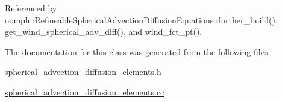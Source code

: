 Referenced by oomph\+::\+Refineable\+Spherical\+Advection\+Diffusion\+Equations\+::further\+\_\+build(), get\+\_\+wind\+\_\+spherical\+\_\+adv\+\_\+diff(), and wind\+\_\+fct\+\_\+pt().



The documentation for this class was generated from the following files\+:\begin{DoxyCompactItemize}
\item 
\hyperlink{spherical__advection__diffusion__elements_8h}{spherical\+\_\+advection\+\_\+diffusion\+\_\+elements.\+h}\item 
\hyperlink{spherical__advection__diffusion__elements_8cc}{spherical\+\_\+advection\+\_\+diffusion\+\_\+elements.\+cc}\end{DoxyCompactItemize}
